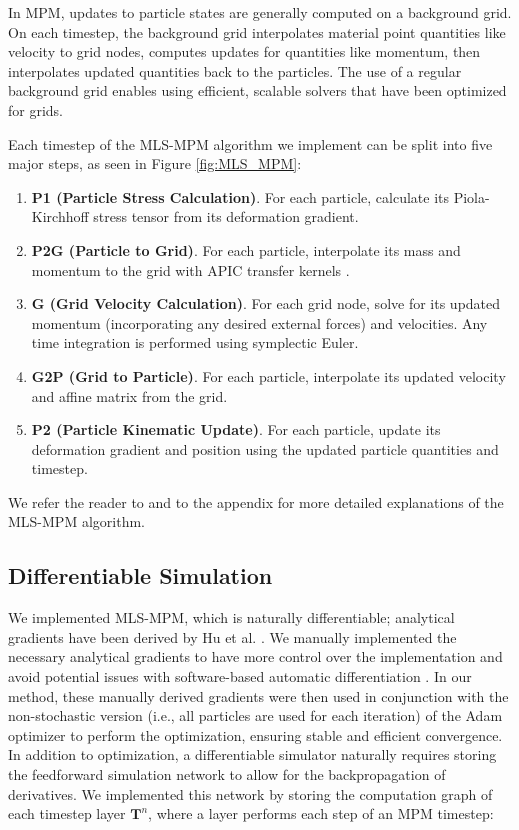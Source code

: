     In MPM, updates to particle states are generally computed on a background grid.
    On each timestep, the background grid interpolates material point quantities like velocity to grid nodes, computes updates for quantities like momentum, then interpolates updated quantities back to the particles.
    The use of a regular background grid enables using efficient, scalable solvers that have been optimized for grids.
    
    Each timestep of the {MLS-MPM} algorithm we implement can be split into five major steps, as seen in Figure \ref{fig:MLS_MPM}:
        \begin{enumerate}
          \item \textbf{P1 (Particle Stress Calculation)}. For each particle, calculate its Piola-Kirchhoff stress tensor from its deformation gradient.
          \item \textbf{P2G (Particle to Grid)}. For each particle, interpolate its mass and momentum to the grid with APIC transfer kernels \citep{2015-APIC, jiang2017angular}.
          \item \textbf{G (Grid Velocity Calculation)}. For each grid node, solve for its updated momentum (incorporating any desired external forces) and velocities. %
          Any time integration is performed using symplectic Euler.
          \item \textbf{G2P (Grid to Particle)}. For each particle, interpolate its updated velocity and affine matrix from the grid.
          \item \textbf{P2 (Particle Kinematic Update)}. For each particle, update its deformation gradient and position using the updated particle quantities and timestep.
        \end{enumerate}
    We refer the reader to \citep{2018-MLSMPM} and to the appendix for more detailed explanations of the {MLS-MPM} algorithm.

\subsection{Differentiable Simulation} 
    We implemented {MLS-MPM}, which is naturally differentiable; analytical gradients have been derived by Hu et al. \citep{2018-ChainQueen}. 
    We manually implemented the necessary analytical gradients to have more control over the implementation and avoid potential issues with software-based automatic differentiation \citep{johnson2023software}.
    In our method, these manually derived gradients were then used in conjunction with the non-stochastic version (i.e., all particles are used for each iteration) of the Adam optimizer \citep{kingma2014adam} to perform the optimization, ensuring stable and efficient convergence.
    In addition to optimization, a differentiable simulator naturally requires storing the feedforward simulation network to allow for the backpropagation of derivatives.
    We implemented this network by storing the computation graph of each timestep layer $\textbf{T}^n$, where a layer performs each step of an MPM timestep:

